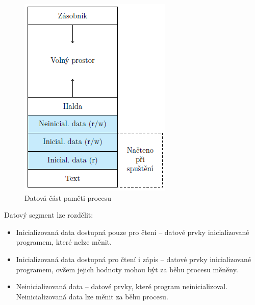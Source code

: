 \begin{figure}[H]
\begin{minipage}[b]{0.4\textwidth}
    \includegraphics[width=\textwidth]{BPC-SOS/images/proc_data_segment.png}
    \caption{Datová část paměti procesu}
  \end{minipage}
\end{figure}

Datový segment lze rozdělit:

\begin{itemize}
    \item  Inicializovaná data dostupná pouze pro čtení – datové prvky inicializované programem,
    které nelze měnit.
    \item Inicializovaná data dostupná pro čtení i zápis – datové prvky inicializované programem,
    ovšem jejich hodnoty mohou být za běhu procesu měněny.
    \item Neinicializovaná data – datové prvky, které program neinicializoval. Neinicializovaná
    data lze měnit za běhu procesu.
\end{itemize}

